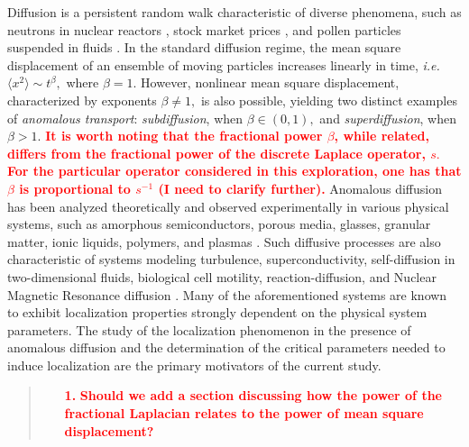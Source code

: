 \documentclass[final,1p,times]{elsarticle}
\theoremstyle{remark}
\theoremstyle{definition}
\newcommand{\josh}[1]{\textcolor{red}{\textbf{#1}}}
\begin{document}
Diffusion is a persistent random walk characteristic of diverse phenomena, such as neutrons in nuclear reactors \cite{osti_4074688}, stock market prices \cite{bachelier2011louis}, and pollen particles suspended in fluids \cite{nelson1967dynamical}. In the standard diffusion regime, the mean square displacement of an ensemble of moving particles increases linearly in time, {\em i.e.} $\langle x^2\rangle \sim t^\beta,$ where $\beta=1.$ However, nonlinear mean square displacement, characterized by exponents $\beta\neq 1,$ is also possible, yielding two distinct examples of {\em anomalous transport}: {\em subdiffusion}, when $\beta\in(0,1),$ and {\em superdiffusion}, when $\beta>1.$
\josh{It is worth noting that the fractional power $\beta$, while related, differs from the fractional power of the discrete Laplace operator, $s.$ For the particular operator considered in this exploration, one has that $\beta$ is proportional to $s^{-1}$ (I need to clarify further).}
Anomalous diffusion has been analyzed theoretically and observed experimentally in various physical systems, such as amorphous semiconductors, porous media, glasses, granular matter, ionic liquids, polymers, and plasmas \cite{shlesinger1993strange,bouchaud1990anomalous,0305-4470-37-31-R01,metzler2000random,10.1007/BFb0106838,binder1999anomalous}. Such diffusive processes are also characteristic of systems modeling turbulence, superconductivity, self-diffusion in two-dimensional fluids, biological cell motility, reaction-diffusion, and Nuclear Magnetic Resonance diffusion \cite{binder1999anomalous,korabel2005understanding,hansen1999dispersion,1367-2630-19-12-123038,UPADHYAYA2001549,droz1999fronts,palombo2013structural}. 
Many of the aforementioned systems are known to exhibit localization properties strongly dependent on the  physical system parameters. 
The study of the localization phenomenon in the presence of anomalous diffusion and the determination of the critical parameters needed to induce localization are the primary motivators of the current study.
\begin{quote}
\begin{itemize}
\item[\josh{1.}] \josh{Should we add a section discussing how the power of the fractional Laplacian relates to the power of mean square displacement?}
\end{itemize}
\end{quote}
\end{document}
